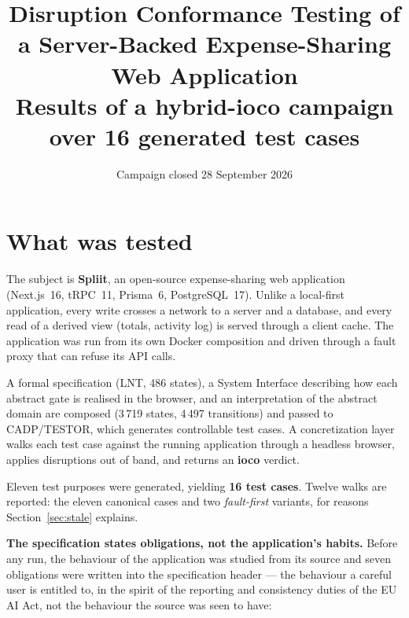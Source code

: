 \documentclass[11pt,a4paper]{article}
\title{\vspace{-1.5em}\textbf{Disruption Conformance Testing of a Server-Backed
Expense-Sharing Web Application}\\[0.3em]
\large Results of a hybrid-\textbf{ioco} campaign over 16 generated test cases}
\author{}
\date{Campaign closed 28 September 2026}
\begin{document}
\maketitle
\vspace{-2.5em}

\section{What was tested}

The subject is \textbf{Spliit}, an open-source expense-sharing web application
(Next.js~16, tRPC~11, Prisma~6, PostgreSQL~17). Unlike a local-first
application, every write crosses a network to a server and a database, and
every read of a derived view (totals, activity log) is served through a client
cache. The application was run from its own Docker composition and driven
through a fault proxy that can refuse its API calls.

A formal specification (LNT, 486 states), a System Interface describing how each
abstract gate is realised in the browser, and an interpretation of the abstract
domain are composed (3\,719 states, 4\,497 transitions) and passed to
CADP/TESTOR, which generates controllable test cases. A concretization layer walks
each test case against the running application through a headless browser,
applies disruptions out of band, and returns an \textbf{ioco} verdict.

Eleven test purposes were generated, yielding \textbf{16 test cases}. Twelve
walks are reported: the eleven canonical cases and two \emph{fault-first}
variants, for reasons Section~\ref{sec:stale} explains.

\medskip
\noindent\textbf{The specification states obligations, not the application's
habits.} Before any run, the behaviour of the application was studied from its
source and seven obligations were written into the specification header --- the
behaviour a careful user is entitled to, in the spirit of the reporting and
consistency duties of the EU AI Act, not the behaviour the source was seen to
have:
\end{document}
